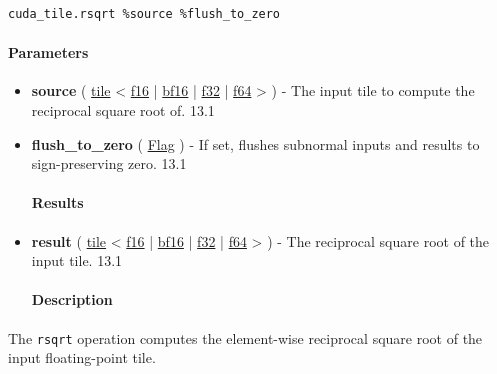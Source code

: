 \documentclass{article}
\begin{document}
\begin{lstlisting}
cuda_tile.rsqrt %source %flush_to_zero
\end{lstlisting}

\paragraph{Parameters}

\begin{itemize}
\item \textbf{source} ( \href{https://docs.nvidia.com/cuda/tile-ir/latest/sections/types.html#type-tile}{tile} < \href{https://docs.nvidia.com/cuda/tile-ir/latest/sections/types.html#subsection-element-types}{f16} | \href{https://docs.nvidia.com/cuda/tile-ir/latest/sections/types.html#subsection-element-types}{bf16} | \href{https://docs.nvidia.com/cuda/tile-ir/latest/sections/types.html#subsection-element-types}{f32} | \href{https://docs.nvidia.com/cuda/tile-ir/latest/sections/types.html#subsection-element-types}{f64} > ) - The input tile to compute the reciprocal square root of. 13.1
\item \textbf{flush\_to\_zero} ( \href{https://docs.nvidia.com/cuda/tile-ir/latest/sections/operations.html#type-flag}{Flag} ) - If set, flushes subnormal inputs and results to sign-preserving zero. 13.1


\paragraph{Results}

\item \textbf{result} ( \href{https://docs.nvidia.com/cuda/tile-ir/latest/sections/types.html#type-tile}{tile} < \href{https://docs.nvidia.com/cuda/tile-ir/latest/sections/types.html#subsection-element-types}{f16} | \href{https://docs.nvidia.com/cuda/tile-ir/latest/sections/types.html#subsection-element-types}{bf16} | \href{https://docs.nvidia.com/cuda/tile-ir/latest/sections/types.html#subsection-element-types}{f32} | \href{https://docs.nvidia.com/cuda/tile-ir/latest/sections/types.html#subsection-element-types}{f64} > ) - The reciprocal square root of the input tile. 13.1


\paragraph{Description}

\end{itemize}
The \texttt{rsqrt} operation computes the element-wise reciprocal square root of the input floating-point tile.
\end{document}
